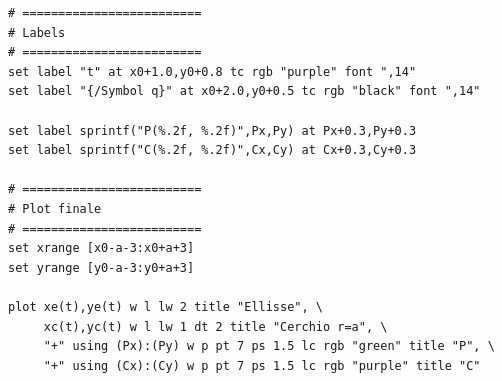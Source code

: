 \documentclass[a4paper,14pt]{article}
\begin{document}
\begin{verbatim}
# =========================
# Labels
# =========================
set label "t" at x0+1.0,y0+0.8 tc rgb "purple" font ",14"
set label "{/Symbol q}" at x0+2.0,y0+0.5 tc rgb "black" font ",14"

set label sprintf("P(%.2f, %.2f)",Px,Py) at Px+0.3,Py+0.3
set label sprintf("C(%.2f, %.2f)",Cx,Cy) at Cx+0.3,Cy+0.3

# =========================
# Plot finale
# =========================
set xrange [x0-a-3:x0+a+3]
set yrange [y0-a-3:y0+a+3]

plot xe(t),ye(t) w l lw 2 title "Ellisse", \
     xc(t),yc(t) w l lw 1 dt 2 title "Cerchio r=a", \
     "+" using (Px):(Py) w p pt 7 ps 1.5 lc rgb "green" title "P", \
     "+" using (Cx):(Cy) w p pt 7 ps 1.5 lc rgb "purple" title "C"

\end{verbatim}
\end{document}
